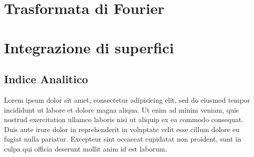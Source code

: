 \documentclass[a4paper, 12pt]{report}
\begin{document}












\chapter{Trasformata di Fourier}











\chapter{Integrazione di superfici}







\newpage

\section{Indice Analitico}

Lorem ipsum dolor sit amet, consectetur adipisicing elit, sed do eiusmod
tempor incididunt ut labore et dolore magna aliqua. Ut enim ad minim veniam,
quis nostrud exercitation ullamco laboris nisi ut aliquip ex ea commodo
consequat. Duis aute irure dolor in reprehenderit in voluptate velit esse
cillum dolore eu fugiat nulla pariatur. Excepteur sint occaecat cupidatat non
proident, sunt in culpa qui officia deserunt mollit anim id est laborum.
\end{document}
